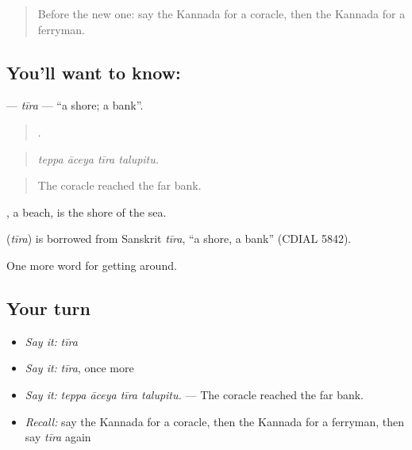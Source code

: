 \label{lesson:KA-C454-tira}



\begin{quote}
Before the new one: say the Kannada for a coracle, then the Kannada for a ferryman.
\end{quote}

\subsection*{You'll want to know: }
\textbf{} — \emph{tīra} — \textquotedblleft{}a shore; a bank\textquotedblright{}.

\begin{quote}
   .
\end{quote}

\begin{quote}
\emph{teppa āceya tīra talupitu.}
\end{quote}

\begin{quote}
The coracle reached the far bank.
\end{quote}

, a beach, is the shore of the sea.

\begin{cousinweb}
\textbf{} (\emph{tīra}) is borrowed from Sanskrit \emph{tīra}, \textquotedblleft{}a shore, a bank\textquotedblright{} (CDIAL 5842).
\end{cousinweb}

\begin{grammarlens}[title={What you've built}]
One more word for getting around.
\end{grammarlens}

\subsection*{Your turn}
\begin{itemize}
\raggedright
  \item \emph{Say it:} \emph{tīra}
  \item \emph{Say it:} \emph{tīra}, once more
  \item \emph{Say it:} \emph{teppa āceya tīra talupitu.} — The coracle reached the far bank.
  \item \emph{Recall:} say the Kannada for a coracle, then the Kannada for a ferryman, then say \emph{tīra} again
\end{itemize}

